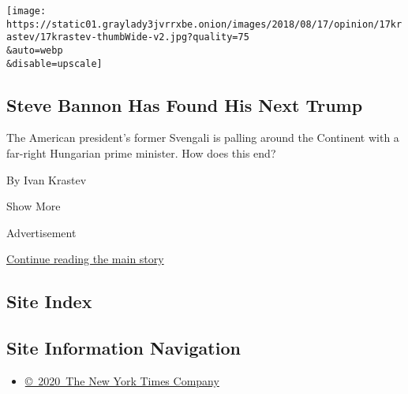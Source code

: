 \begin{enumerate}
  \texttt{[image: https://static01.graylady3jvrrxbe.onion/images/2018/08/17/opinion/17krastev/17krastev-thumbWide-v2.jpg?quality=75\\\&auto=webp\\\&disable=upscale]}

  \hypertarget{steve-bannon-has-found-his-next-trump}{%
  \subsection{Steve Bannon Has Found His Next
  Trump}\label{steve-bannon-has-found-his-next-trump}}

  The American president's former Svengali is palling around the
  Continent with a far-right Hungarian prime minister. How does this
  end?

  By Ivan Krastev
\end{enumerate}

Show More

Advertisement

\protect\hyperlink{after-mid2}{Continue reading the main story}

\hypertarget{site-index}{%
\subsection{Site Index}\label{site-index}}

\hypertarget{site-information-navigation}{%
\subsection{Site Information
Navigation}\label{site-information-navigation}}

\begin{itemize}
\tightlist
\item
  \href{https://help.nytimes3xbfgragh.onion/hc/en-us/articles/115014792127-Copyright-notice}{©~2020~The
  New York Times Company}
\end{itemize}

